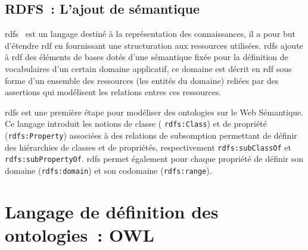 \subsection{RDFS~: L'ajout de sémantique}
\label{sec:semantic-web-rdfs}

\acrshort{rdfs}~\cite{brickley2000resource} est un langage destiné à
la représentation des connaissances, il a pour but d'étendre
\acrshort{rdf} en fournissant une structuration aux ressources
utilisées. \acrshort{rdfs} ajoute à \acrshort{rdf} des éléments de
bases dotés d'une sémantique fixée pour la définition de vocabulaires
d'un certain domaine applicatif, ce domaine est décrit en
\acrshort{rdf} sous forme d'un ensemble des ressources (les entités du
domaine) reliées par des assertions qui modélisent les relations
entres ces ressources.\medskip

\acrshort{rdfs} est une première étape pour modéliser des ontologies
sur le Web Sémantique. Ce langage introduit les notions de classe (
\texttt{rdfs:Class}) et de propriété (\texttt{rdfs:Property})
associées à des relations de subsomption permettant de définir des
hiérarchies de classes et de propriétés, respectivement
\texttt{rdfs:subClassOf} et
\texttt{rdfs:subPropertyOf}. \acrshort{rdfs} permet également pour
chaque propriété de définir son domaine (\texttt{rdfs:domain}) et son
codomaine (\texttt{rdfs:range}).




\section{Langage de définition des ontologies~: OWL}
\label{sec:semantic-web-owl}





